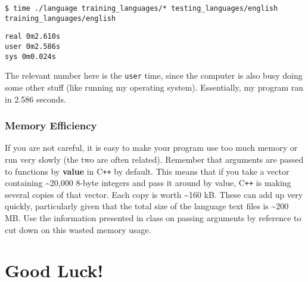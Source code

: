 \documentclass[]{article}
\begin{document}
\texttt{\$ time ./language training_languages/* testing_languages/english}
\texttt{training_languages/english}


\texttt{real     0m2.610s}\\
\texttt{user     0m2.586s}\\
\texttt{sys      0m0.024s}

The relevant number here is the \texttt{user} time, since the computer
is also busy doing some other stuff (like running my operating system).
Essentially, my program ran in 2.586 seconds.

\subsubsection{Memory Efficiency}\label{memory-efficiency}

If you are not careful, it is easy to make your program use too much
memory or run very slowly (the two are often related). Remember that
arguments are passed to functions by \textbf{value} in C\texttt{++} by default.
This means that if you take a vector containing \textasciitilde{}20,000
8-byte integers and pass it around by value, C\texttt{++} is making several
copies of that vector. Each copy is worth \textasciitilde{}160 kB. These
can add up very quickly, particularly given that the total size of the
language text files is \textasciitilde{}200 MB. Use the information
presented in class on passing arguments by reference to cut down on this
wasted memory usage.

\section{Good Luck!}\label{good-luck}
\end{document}

